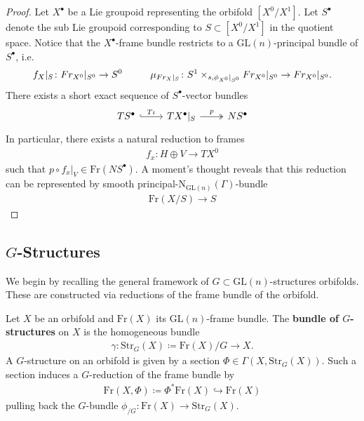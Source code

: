 \documentclass[psamsfonts]{amsart}
\theoremstyle{plain}
\theoremstyle{definition}{
\newtheorem{defi}{Definition}[section]
\newtheorem{ass}{Assumption}
\newtheorem*{nota}{Notation}}
\theoremstyle{remark}{
\newtheorem{rem}{Remark}
\newtheorem{ex}{Example}}
\theoremstyle{plain}{
\newtheorem{thm}{Theorem}[section]
\newtheorem{lem}{Lemma}[section]
\newtheorem{cor}{Corollary}[section]
\newtheorem{prop}{Proposition}[section]
\newtheorem{con}{Conjecture}[section]}
\newcommand{\m}[1]{{\mathrm{#1}}}
\begin{document}
\begin{proof}
Let $X^\bullet$ be a Lie groupoid representing the orbifold $[X^0/X^1]$. Let $S^\bullet$ denote the sub Lie groupoid corresponding to $S\subset [X^0/X^1]$ in the quotient space. Notice that the $X^\bullet$-frame bundle restricts to a $\m{GL}(n)$-principal bundle of $S^\bullet$, i.e. 
\begin{align*}
    f_X|_S\colon Fr_{X^0}|_{S^0}\rightarrow S^0\hspace{1.0cm}\mu_{Fr_X|_S}\colon S^1\times_{s,\phi_{X^0}|_{S^0}}Fr_{X^0}|_{S^0}\rightarrow Fr_{X^0}|_{S^0}.
\end{align*}
There exists a short exact sequence of $S^\bullet$-vector bundles 
\begin{equation*}
    \begin{tikzcd}
        TS^\bullet\arrow[r,"T\iota",hook]&TX^\bullet|_S\arrow[r,"p",two heads]&NS^\bullet
    \end{tikzcd}
\end{equation*}
In particular, there exists a natural reduction to frames 
\begin{align*}
    f_x\colon H\oplus V\rightarrow TX^0
\end{align*}
such that $p\circ f_x|_V\in \m{Fr}(NS^\bullet)$. A moment's thought reveals that this reduction can be represented by smooth principal-$\m{N}_{\m{GL}(n)}({\Gamma})$-bundle 
\begin{align*}
    \m{Fr}(X/S)\rightarrow S
\end{align*}
\end{proof}




\subsection{$G$-Structures}
\label{G Structures}

We begin by recalling the general framework of $G\subset\m{GL}(n)$-structures orbifolds. These are constructed via reductions of the frame bundle of the orbifold. 
 
\begin{defi}
Let $X$ be an orbifold and $\m{Fr}(X)$ its $\m{GL}(n)$-frame bundle. The \textbf{bundle of $G$-structures} on $X$ is the homogeneous bundle
    \begin{align*}
        \gamma\colon \m{Str}_G(X)\coloneqq\m{Fr}(X)/G\rightarrow X.
    \end{align*}
    A $G$-structure on an orbifold is given by a section $\Phi\in \Gamma(X,\m{Str}_G(X))$. Such a section induces a $G$-reduction of the frame bundle by 
    \begin{align*}
        \m{Fr}(X,\Phi)\coloneqq \Phi^*\m{Fr}(X)\hookrightarrow \m{Fr}(X)
    \end{align*}
    pulling back the $G$-bundle $\phi_{/G}\colon \m{Fr}(X)\rightarrow \m{Str}_G(X)$. 
\end{defi}
\end{document}
